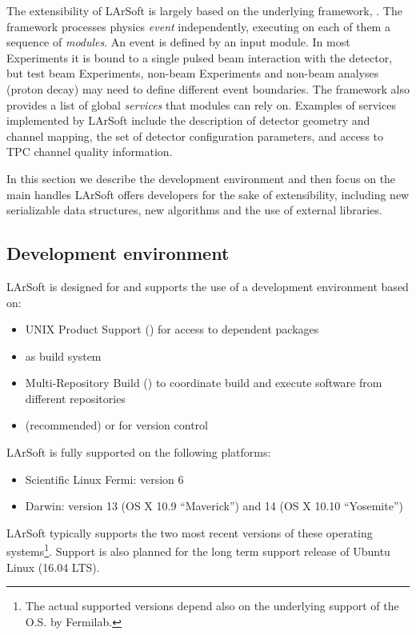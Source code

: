 
The extensibility of LArSoft is largely based on the underlying
framework, \ART. The \ART framework processes physics \emph{event}
independently, executing on each of them a sequence of \emph{modules}.
An event is defined by an input module.
In most Experiments it is bound to a single pulsed beam interaction with the detector,
but test beam Experiments, non-beam Experiments and non-beam analyses (\eg proton decay)
may need to define different event boundaries.
The framework also provides a list of global \emph{services} that modules can rely on.
Examples of services implemented by LArSoft include
the description of detector geometry and channel mapping,
the set of detector configuration parameters,
and access to TPC channel quality information.

In this section we describe the development environment
and then focus on the main handles LArSoft offers developers for the sake of extensibility,
including new serializable data structures, new algorithms
and the use of external libraries.


\subsection{Development environment}
\label{ssec:Development:Environment}

LArSoft is designed for and supports the use of a development environment based on:
\begin{itemize}
   \item UNIX Product Support (\UPS) for access to dependent packages
   \item \cetbuildtools\cite{cetbuildtools} as build system
   \item Multi-Repository Build\cite{MRB} (\MRB)  to coordinate build and execute software from different repositories
   \item \git (recommended) or \SVN for version control
\end{itemize}

LArSoft is fully supported on the following platforms:
\begin{itemize}
   \item Scientific Linux Fermi: version 6
   \item Darwin: version 13 (OS X 10.9 ``Maverick'') and 14 (OS X 10.10 ``Yosemite'')
\end{itemize}
LArSoft typically supports the two most recent versions of these operating systems\footnote{
The actual supported versions depend also on the underlying support of the O.S. by Fermilab.
}.
Support is also planned for the long term support release of Ubuntu Linux (16.04 LTS).

